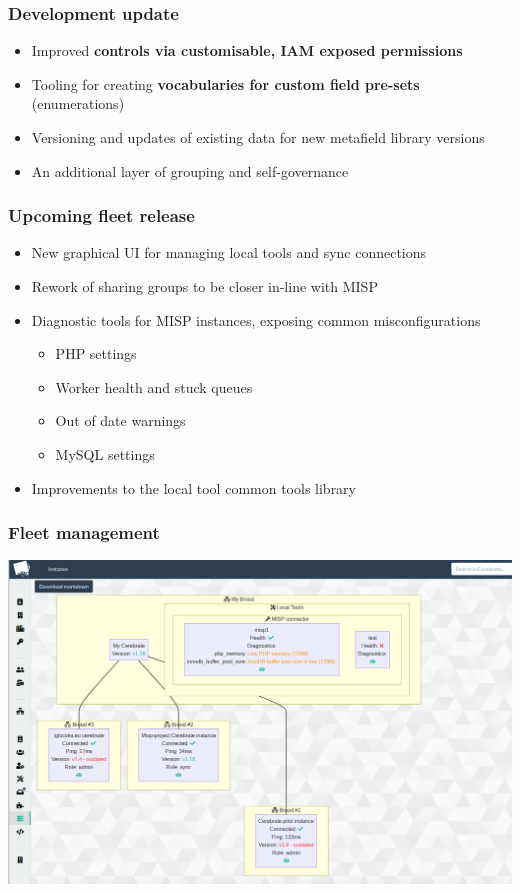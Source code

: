 \begin{frame}
\frametitle{Development update}
    \begin{itemize}
        \item Improved {\bf controls via customisable, IAM exposed permissions}
        \item Tooling for creating {\bf vocabularies for custom field pre-sets} (enumerations)
        \item Versioning and updates of existing data for new metafield library versions
        \item An additional layer of grouping and self-governance
    \end{itemize}
\end{frame}

\begin{frame}
\frametitle{Upcoming fleet release}
    \begin{itemize}
        \item New graphical UI for managing local tools and sync connections
        \item Rework of sharing groups to be closer in-line with MISP
        \item Diagnostic tools for MISP instances, exposing common misconfigurations
        \begin{itemize}
          \item PHP settings
          \item Worker health and stuck queues
          \item Out of date warnings
          \item MySQL settings
        \end{itemize}
        \item Improvements to the local tool common tools library
    \end{itemize}
\end{frame}

\begin{frame}
\frametitle{Fleet management}
  \begin{center}
    \includegraphics[width=1\linewidth]{pictures/topology.png}
  \end{center}
\end{frame}

